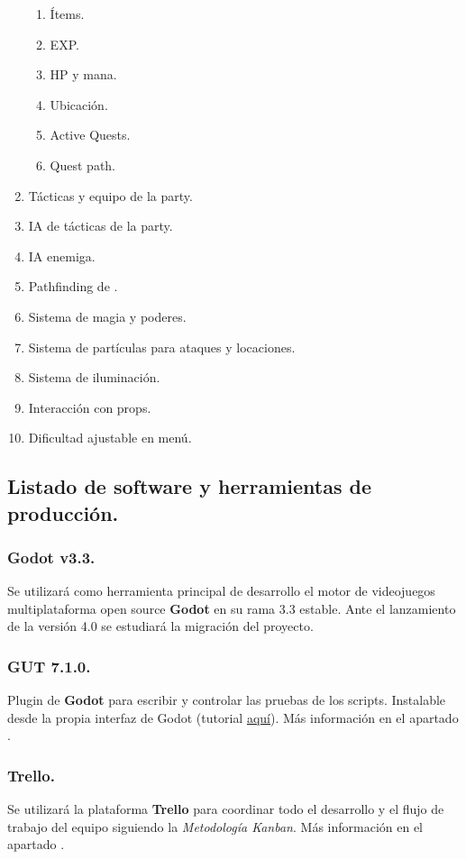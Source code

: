 \begin{enumerate}
	\begin{enumerate}
		\item Ítems.
		\item EXP.
		\item HP y mana.
		\item Ubicación.
		\item Active Quests.
		\item Quest path.
	\end{enumerate}
	\item Tácticas y equipo de la party.
	\item IA de tácticas de la party.
	\item IA enemiga.
	\item Pathfinding de .
	\item Sistema de magia y poderes.
	\item Sistema de partículas para ataques y locaciones.
	\item Sistema de iluminación.
	\item Interacción con props.
	\item Dificultad ajustable en menú.
\end{enumerate}

\subsection{Listado de software y herramientas de producción.}\label{intro:software-y-herramientas}

\subsubsection{Godot v3.3.}
Se utilizará como herramienta principal de desarrollo el motor de videojuegos multiplataforma open source \textbf{Godot} en su rama 3.3 estable. Ante el lanzamiento de la versión 4.0 se estudiará la migración del proyecto.

\subsubsection*{\small GUT 7.1.0.}
Plugin de \textbf{Godot} para escribir y controlar las pruebas de los scripts. Instalable desde la propia interfaz de Godot (tutorial \href{https://www.youtube.com/watch?v=5DrhMiuLRl0}{aquí}). Más información en el apartado .

\subsubsection{Trello.}
Se utilizará la plataforma \textbf{Trello} para coordinar todo el desarrollo y el flujo de trabajo del equipo siguiendo la \emph{Metodología Kanban}. Más información en el apartado .

